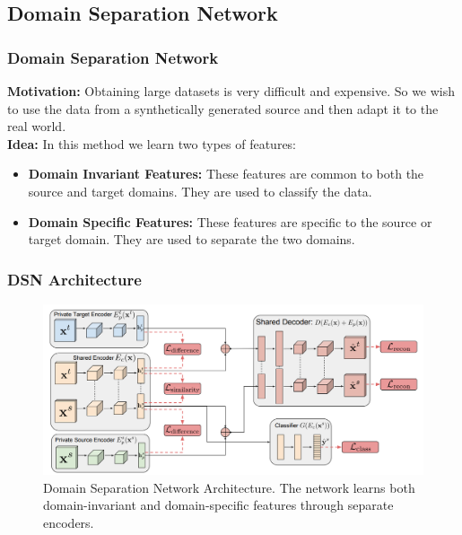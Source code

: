 \documentclass{beamer}
\begin{document}
    



\subsection{Domain Separation Network}
\begin{frame}
    \frametitle{Domain Separation Network}
    \textbf{Motivation:} Obtaining large datasets is very difficult and expensive. So we wish to use the data from a synthetically generated source and then adapt it to the real world.\\
    \textbf{Idea:} In this method we learn two types of features:
    \begin{itemize}
        \item \textbf{Domain Invariant Features:} These features are common to both the source and target domains. They are used to classify the data.
        \item \textbf{Domain Specific Features:} These features are specific to the source or target domain. They are used to separate the two domains.
    \end{itemize}
\end{frame}

\begin{frame}
    \frametitle{DSN Architecture}

    \begin{figure}
        \centering
        \includegraphics[width=0.9\linewidth]{DSN_Architecture.png}
        \caption{Domain Separation Network Architecture. The network learns both domain-invariant and domain-specific features through separate encoders.}
    \end{figure}

\end{frame}

\end{document}
